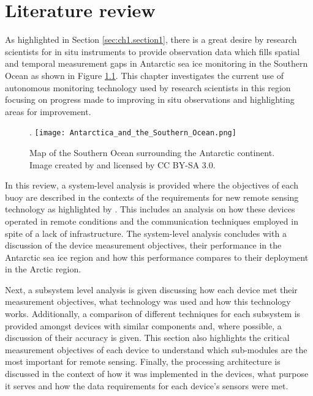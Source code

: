 
\chapter{Literature review}
\label{ch:chapter2}
As highlighted in Section \ref{sec:ch1.section1}, there is a great desire by research scientists for in situ instruments to provide observation data which fills spatial and temporal measurement gaps in Antarctic sea ice monitoring in the Southern Ocean as shown in Figure \ref{fig:Antarctica_Southern_Ocean}. This chapter investigates the current use of autonomous monitoring technology used by research scientists in this region focusing on progress made to improving in situ observations and highlighting areas for improvement. 
\begin{figure}[H]
	\centering. 
	\texttt{[image: Antarctica\_and\_the\_Southern\_Ocean.png]}
	\caption{Map of the Southern Ocean surrounding the Antarctic continent. Image created by \textcite{Hogweed2015Ocean} and licensed by CC BY-SA 3.0.}
	\label{fig:Antarctica_Southern_Ocean}
\end{figure}

 In this review, a system-level  analysis is provided where the objectives of each buoy are described in the contexts of the requirements for new remote sensing technology as highlighted by \textcite{kennicutt2016delivering}. This includes an analysis on how these devices operated in remote conditions and the communication techniques employed in spite of a lack of infrastructure. The system-level analysis concludes with a discussion of the device measurement objectives, their performance in the Antarctic sea ice region and how this performance compares to their deployment in the Arctic region.\par
 
Next, a subsystem level analysis is given discussing how each device met their measurement objectives, what technology was used and how this technology works. Additionally, a comparison of different techniques for each subsystem is provided amongst devices with similar components and, where possible, a discussion of their accuracy is given. This section also highlights the critical measurement objectives of each device to understand which sub-modules are the most important for remote sensing. Finally, the processing architecture is discussed in the context of how it was implemented in the devices, what purpose it serves and how the data requirements for each device's sensors were met.

